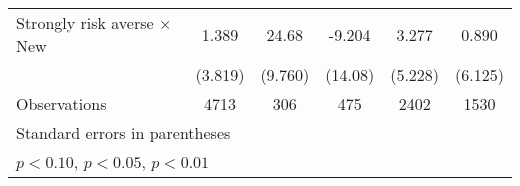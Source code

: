{\begin{longtable}{l*{5}{c}}
Strongly risk averse $\times$ New&       1.389         &       24.68\sym{**} &      -9.204         &       3.277         &       0.890         \\
                    &     (3.819)         &     (9.760)         &     (14.08)         &     (5.228)         &     (6.125)         \\
\midrule
Observations        &        4713         &         306         &         475         &        2402         &        1530         \\
\bottomrule
\multicolumn{6}{l}{\footnotesize Standard errors in parentheses}\\
\multicolumn{6}{l}{\footnotesize \sym{*} \(p<0.10\), \sym{**} \(p<0.05\), \sym{***} \(p<0.01\)}\\
\end{longtable}
}

